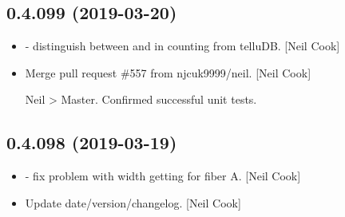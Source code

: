 \documentclass[a4paper,10pt,english]{report}
\begin{document}
\subsection{0.4.099 (2019-03-20)}
\label{\detokenize{misc/changelog:id161}}\begin{itemize}
\item {} 
 - distinguish between  and 
in counting from telluDB. {[}Neil Cook{]}

\item {} 
Merge pull request \#557 from njcuk9999/neil. {[}Neil Cook{]}

Neil \textendash{}\textgreater{} Master. Confirmed successful unit tests.

\end{itemize}


\subsection{0.4.098 (2019-03-19)}
\label{\detokenize{misc/changelog:id162}}\begin{itemize}
\item {} 
 - fix problem with width getting for fiber
A. {[}Neil Cook{]}

\item {} 
Update date/version/changelog. {[}Neil Cook{]}

\end{itemize}
\end{document}
